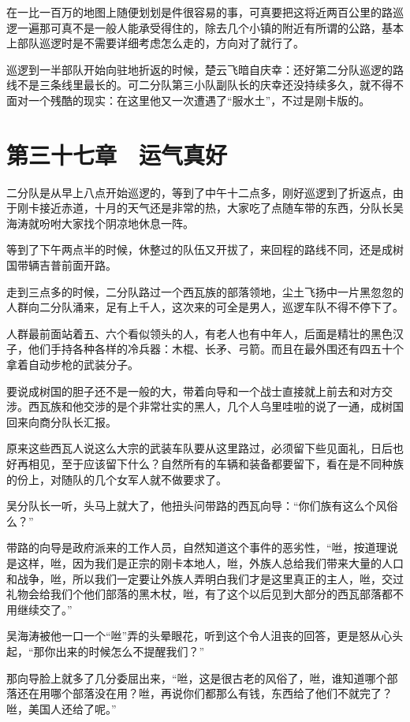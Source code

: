 在一比一百万的地图上随便划划是件很容易的事，可真要把这将近两百公里的路巡逻一遍那可真不是一般人能承受得住的，除去几个小镇的附近有所谓的公路，基本上部队巡逻时是不需要详细考虑怎么走的，方向对了就行了。

巡逻到一半部队开始向驻地折返的时候，楚云飞暗自庆幸：还好第二分队巡逻的路线不是三条线里最长的。可二分队第三小队副队长的庆幸还没持续多久，就不得不面对一个残酷的现实：在这里他又一次遭遇了“服水土”，不过是刚卡版的。

\section{第三十七章　运气真好}

二分队是从早上八点开始巡逻的，等到了中午十二点多，刚好巡逻到了折返点，由于刚卡接近赤道，十月的天气还是非常的热，大家吃了点随车带的东西，分队长吴海涛就吩咐大家找个阴凉地休息一阵。

等到了下午两点半的时候，休整过的队伍又开拔了，来回程的路线不同，还是成树国带辆吉普前面开路。

走到三点多的时候，二分队路过一个西瓦族的部落领地，尘土飞扬中一片黑忽忽的人群向二分队涌来，足有上千人，这次来的可全是男人，巡逻车队不得不停下了。

人群最前面站着五、六个看似领头的人，有老人也有中年人，后面是精壮的黑色汉子，他们手持各种各样的冷兵器：木棍、长矛、弓箭。而且在最外围还有四五十个拿着自动步枪的武装分子。

要说成树国的胆子还不是一般的大，带着向导和一个战士直接就上前去和对方交涉。西瓦族和他交涉的是个非常壮实的黑人，几个人乌里哇啦的说了一通，成树国回来向商分队长汇报。

原来这些西瓦人说这么大宗的武装车队要从这里路过，必须留下些见面礼，日后也好再相见，至于应该留下什么？自然所有的车辆和装备都要留下，看在是不同种族的份上，对随队的几个女军人就不做要求了。

吴分队长一听，头马上就大了，他扭头问带路的西瓦向导：“你们族有这么个风俗么？”

带路的向导是政府派来的工作人员，自然知道这个事件的恶劣性，“咝，按道理说是这样，咝，因为我们是正宗的刚卡本地人，咝，外族人总给我们带来大量的人口和战争，咝，所以我们一定要让外族人弄明白我们才是这里真正的主人，咝，交过礼物会给我们个他们部落的黑木杖，咝，有了这个以后见到大部分的西瓦部落都不用继续交了。”

吴海涛被他一口一个“咝”弄的头晕眼花，听到这个令人沮丧的回答，更是怒从心头起，“那你出来的时候怎么不提醒我们？”

那向导脸上就多了几分委屈出来，“咝，这是很古老的风俗了，咝，谁知道哪个部落还在用哪个部落没在用？咝，再说你们都那么有钱，东西给了他们不就完了？咝，美国人还给了呢。”

